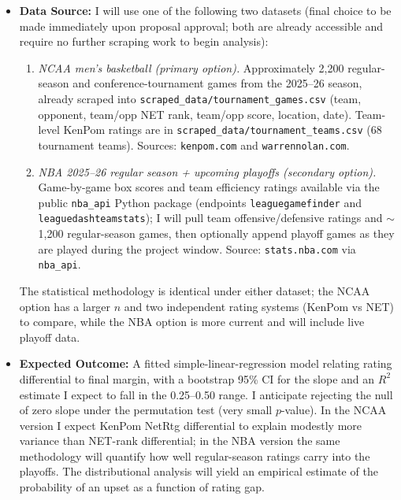 \documentclass[11pt]{article}
\begin{document}
\begin{itemize}[leftmargin=*]
  \item \textbf{Data Source:} I will use one of the following two datasets (final choice to be made immediately upon proposal approval; both are already accessible and require no further scraping work to begin analysis):
  \begin{enumerate}
    \item \emph{NCAA men's basketball (primary option).} Approximately 2{,}200 regular-season and conference-tournament games from the 2025--26 season, already scraped into \texttt{scraped\_data/tournament\_games.csv} (team, opponent, team/opp NET rank, team/opp score, location, date). Team-level KenPom ratings are in \texttt{scraped\_data/tournament\_teams.csv} (68 tournament teams). Sources: \texttt{kenpom.com} and \texttt{warrennolan.com}.
    \item \emph{NBA 2025--26 regular season + upcoming playoffs (secondary option).} Game-by-game box scores and team efficiency ratings available via the public \texttt{nba\_api} Python package (endpoints \texttt{leaguegamefinder} and \texttt{leaguedashteamstats}); I will pull team offensive/defensive ratings and $\sim$1{,}200 regular-season games, then optionally append playoff games as they are played during the project window. Source: \texttt{stats.nba.com} via \texttt{nba\_api}.
  \end{enumerate}
  The statistical methodology is identical under either dataset; the NCAA option has a larger $n$ and two independent rating systems (KenPom vs NET) to compare, while the NBA option is more current and will include live playoff data.

  \item \textbf{Expected Outcome:} A fitted simple-linear-regression model relating rating differential to final margin, with a bootstrap 95\% CI for the slope and an $R^2$ estimate I expect to fall in the 0.25--0.50 range. I anticipate rejecting the null of zero slope under the permutation test (very small $p$-value). In the NCAA version I expect KenPom NetRtg differential to explain modestly more variance than NET-rank differential; in the NBA version the same methodology will quantify how well regular-season ratings carry into the playoffs. The distributional analysis will yield an empirical estimate of the probability of an upset as a function of rating gap.
\end{itemize}
\end{document}

